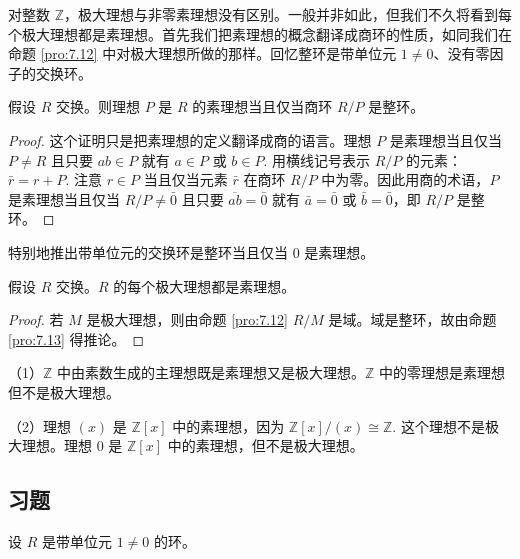 对整数 \(\mathbb{Z}\)，极大理想与非零素理想没有区别。一般并非如此，但我们不久将看到每个极大理想都是素理想。首先我们把素理想的概念翻译成商环的性质，如同我们在命题 \ref{pro:7.12} 中对极大理想所做的那样。回忆整环是带单位元 \(1 \neq 0\)、没有零因子的交换环。

\begin{proposition}\label{pro:7.13}
假设 \(R\) 交换。则理想 \(P\) 是 \(R\) 的素理想当且仅当商环 \(R/P\) 是整环。
\end{proposition}

\begin{proof}
这个证明只是把素理想的定义翻译成商的语言。理想 \(P\) 是素理想当且仅当 \(P \neq R\) 且只要 \(ab \in P\) 就有 \(a \in P\) 或 \(b \in P\). 用横线记号表示 \(R/P\) 的元素：\(\bar{r} = r+P\). 注意 \(r \in P\) 当且仅当元素 \(\bar{r}\) 在商环 \(R/P\) 中为零。因此用商的术语，\(P\) 是素理想当且仅当 \(R/P \neq \bar{0}\) 且只要 \(\overline{ab} = \bar{0}\) 就有 \(\bar{a} = \bar{0}\) 或 \(\bar{b} = \bar{0}\)，即 \(R/P\) 是整环。
\end{proof}

特别地推出带单位元的交换环是整环当且仅当 0 是素理想。

\begin{corollary}\label{cor:7.14}
假设 \(R\) 交换。\(R\) 的每个极大理想都是素理想。
\end{corollary}

\begin{proof}
若 \(M\) 是极大理想，则由命题 \ref{pro:7.12} \(R/M\) 是域。域是整环，故由命题 \ref{pro:7.13} 得推论。
\end{proof}

\begin{example}
（1）\(\mathbb{Z}\) 中由素数生成的主理想既是素理想又是极大理想。\(\mathbb{Z}\) 中的零理想是素理想但不是极大理想。

（2）理想 \((x)\) 是 \(\mathbb{Z}[x]\) 中的素理想，因为 \(\mathbb{Z}[x]/(x) \cong \mathbb{Z}\). 这个理想不是极大理想。理想 0 是 \(\mathbb{Z}[x]\) 中的素理想，但不是极大理想。
\end{example}

\subsection*{习题}
设 \(R\) 是带单位元 \(1 \neq 0\) 的环。

